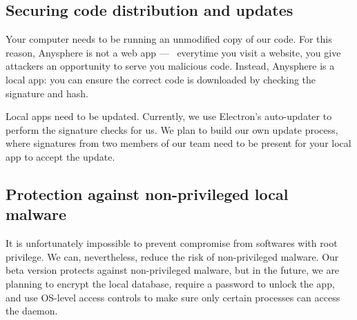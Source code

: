 \subsection{Securing code distribution and updates}

Your computer needs to be running an unmodified copy of our code. For this reason, Anysphere is not a web app —  everytime you visit a website, you give attackers an opportunity to serve you malicious code. Instead, Anysphere is a local app: you can ensure the correct code is downloaded by checking the signature and hash.



Local apps need to be updated. Currently, we use Electron's auto-updater to perform the signature checks for us. We plan to build our own update process, where signatures from two members of our team need to be present for your local app to accept the update. 


\subsection{Protection against non-privileged local malware}

It is unfortunately impossible to prevent compromise from softwares with root privilege. We can, nevertheless, reduce the risk of non-privileged malware. Our beta version protects against non-privileged malware, but in the future, we are planning to encrypt the local database, require a password to unlock the app, and use OS-level access controls to make sure only certain processes can access the daemon.

